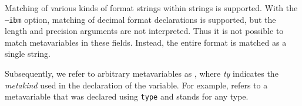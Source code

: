 Matching of various kinds of format strings within strings is supported.
With the {\tt --ibm} option, matching of decimal format declarations is
supported, but the length and precision arguments are not interpreted.
Thus it is not possible to match metavariables in these fields.  Instead,
the entire format is matched as a single string.

\begin{grammar}


    









\end{grammar}

Subsequently, we refer to arbitrary metavariables as
, where {\it{ty}}
indicates the {\it metakind} used in the declaration of the variable.
For example,  refers to a metavariable
that was declared using \texttt{type} and stands for any type.

